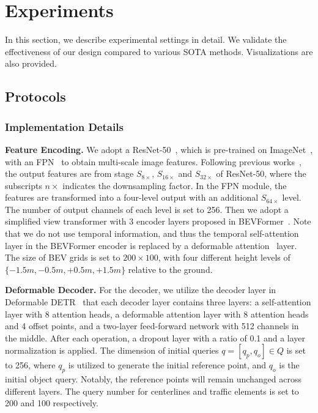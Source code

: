 \section{Experiments}
\label{sec:exp}

In this section, we describe experimental settings in detail.
We validate the effectiveness of our design compared to various SOTA methods.
Visualizations are also provided.

\subsection{Protocols}
\label{sec:exp-protocal}

\subsubsection{Implementation Details}

\textbf{Feature Encoding.}
We adopt a ResNet-50~\cite{he2016resnet}, which is pre-trained on ImageNet~\cite{deng2009imagenet}, with an FPN~\cite{lin2017feature} to obtain multi-scale image features. 
Following previous works~\cite{zhu2020deformabledetr,li2022bevformer}, the output features are from stage $S_{8\times}$, $S_{16\times}$ and $S_{32\times}$ of ResNet-50, where the subscripts $n\times$ indicates the downsampling factor.
In the FPN module, the features are transformed into a four-level output with an additional $S_{64\times}$ level. 
The number of output channels of each level is set to 256. 
Then we adopt a simplified view transformer with 3 encoder layers proposed in BEVFormer~\cite{li2022bevformer}. 
Note that we do not use temporal information, and thus the temporal self-attention layer in the BEVFormer encoder is replaced by a deformable attention~\cite{zhu2020deformabledetr} layer.
The size of BEV grids is set to $200 \times 100$, with four different height levels of $\{-1.5m, -0.5m, +0.5m, +1.5m\}$ relative to the ground. 



\smallskip
\noindent
\textbf{Deformable Decoder.}
For the decoder, we utilize the decoder layer in Deformable DETR~\cite{zhu2020deformabledetr} that each decoder layer contains three layers: 
a self-attention layer with 8 attention heads, 
a deformable attention layer with 8 attention heads and 4 offset points,
and a two-layer feed-forward network with 512 channels in the middle. 
After each operation, a dropout layer with a ratio of 0.1 and a layer normalization is applied. 
The dimension of initial queries $q=[q_p, q_o] \in Q$ is set to 256, where $q_p$ is utilized to generate the initial reference point, and $q_o$ is the initial object query.
Notably, the reference points will remain unchanged across different layers.
The query number for centerlines and traffic elements is set to 200 and 100 respectively.


